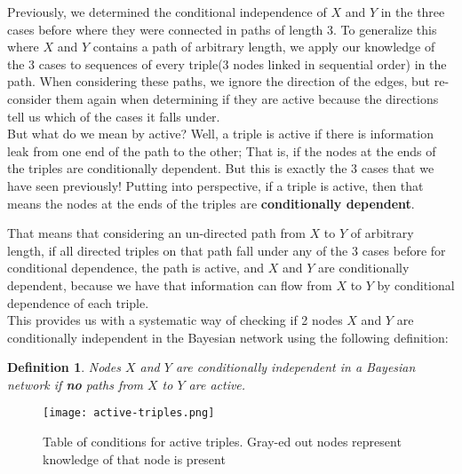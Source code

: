 \documentclass[12pt]{article}
\newtheorem{definition}{Definition}
\begin{document}
Previously, we determined the conditional independence of $X$ and $Y$ in the three cases before where they were connected in paths of length 3. To generalize this where $X$ and $Y$ contains a path of arbitrary length, we apply our knowledge of the 3 cases to sequences of every triple(3 nodes linked in sequential order) in the path. When considering these paths, we ignore the direction of the edges, but re-consider them again when determining if they are active because the directions tell us which of the cases it falls under.\\

But what do we mean by active? Well, a triple is active if there is information leak from one end of the path to the other; That is, if the nodes at the ends of the triples are conditionally dependent. But this is exactly the 3 cases that we have seen previously! Putting into perspective, if a triple is active, then that means the nodes at the ends of the triples are \textbf{conditionally dependent}.

That means that considering an un-directed path from $X$ to $Y$ of arbitrary length, if all directed triples on that path fall under any of the 3 cases before for conditional dependence, the path is active, and $X$ and $Y$ are conditionally dependent, because we have that information can flow from $X$ to $Y$ by conditional dependence of each triple.\\

This provides us with a systematic way of checking if 2 nodes $X$ and $Y$ are conditionally independent in the Bayesian network using the following definition:

\begin{definition}
Nodes $X$ and $Y$ are conditionally independent in a Bayesian network if \textbf{no} paths from $X$ to $Y$ are active.
\end{definition}

\begin{center}
\begin{figure}[!htb]
\texttt{[image: active-triples.png]}
\caption{Table of conditions for active triples. Gray-ed out nodes represent knowledge of that node is present}
\label{fig:active}
\end{figure}
\end{center}
\end{document}
